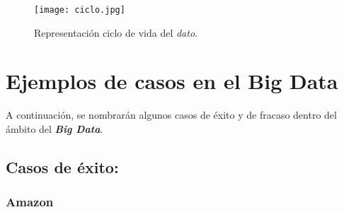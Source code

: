 \documentclass[11pt]{diazessay} %
\begin{document}
\begin{figure}[h!]
	\centering
	\texttt{[image: ciclo.jpg]}
	\caption{Representación ciclo de vida del \textit{dato}.}
	\label{fig:ciclo-dato}
\end{figure}


\newpage
\section*{Ejemplos de casos en el Big Data}
A continuación, se nombrarán algunos casos de éxito y de fracaso dentro del ámbito del \textit{\textbf{Big Data}}.\\

\subsection*{Casos de éxito:}

\subsubsection*{Amazon}




\newpage




\end{document}
